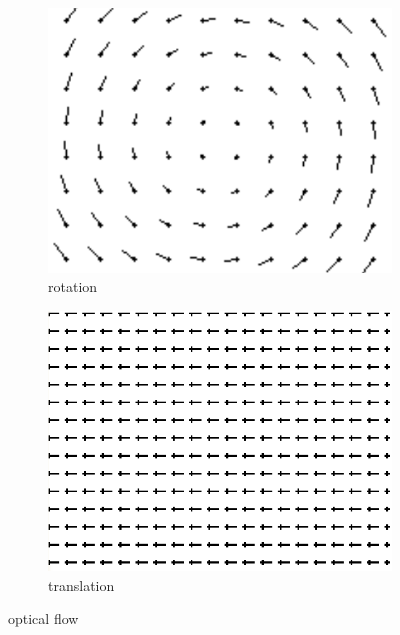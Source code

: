 \documentclass[11pt]{article}
\begin{document}
	\begin{figure}[H]
	        \centering
	        \begin{subfigure}[b]{0.35\textwidth}
	                \includegraphics[width=1.0\textwidth]{images/rotation.png}
	                \caption{rotation}
	        \end{subfigure}\hfill 
	        \begin{subfigure}[b]{0.35\textwidth}
	                \includegraphics[width=1.0\textwidth]{images/translation.png}
	                \caption{translation}
	        \end{subfigure}
	\caption{optical flow \cite{BewegungsanalyseMuenchen}}

	\end{figure}
\end{document}
